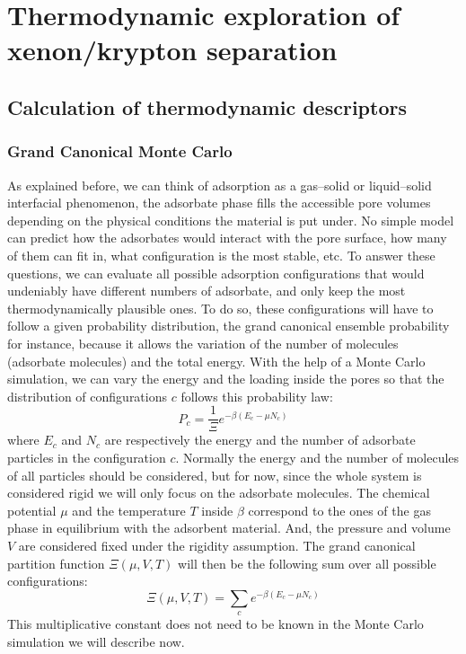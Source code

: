 \documentclass[main.tex]{subfiles}
\begin{document}
\chapter{Thermodynamic exploration of xenon/krypton separation}
\vspace*{-1\baselineskip}

\section{Calculation of thermodynamic descriptors}

\subsection{Grand Canonical Monte Carlo}

As explained before, we can think of adsorption as a gas--solid or liquid--solid interfacial phenomenon, the adsorbate phase fills the accessible pore volumes depending on the physical conditions the material is put under. No simple model can predict how the adsorbates would interact with the pore surface, how many of them can fit in, what configuration is the most stable, etc. To answer these questions, we can evaluate all possible adsorption configurations that would undeniably have different numbers of adsorbate, and only keep the most thermodynamically plausible ones. To do so, these configurations will have to follow a given probability distribution, the grand canonical ensemble probability for instance, because it allows the variation of the number of molecules (adsorbate molecules) and the total energy. With the help of a Monte Carlo simulation, we can vary the energy and the loading inside the pores so that the distribution of configurations $c$ follows this probability law: 
\begin{equation}
  P_c = \dfrac{1}{\Xi}e^{-\beta\left(E_c-\mu N_c\right)} 
  \label{eqn:gc}
\end{equation}
where $E_c$ and $N_c$ are respectively the energy and the number of adsorbate particles in the configuration $c$. Normally the energy and the number of molecules of all particles should be considered, but for now, since the whole system is considered rigid we will only focus on the adsorbate molecules. The chemical potential $\mu$ and the temperature $T$ inside $\beta$ correspond to the ones of the gas phase in equilibrium with the adsorbent material. And, the pressure and volume $V$ are considered fixed under the rigidity assumption. The grand canonical partition function $\Xi(\mu,V,T)$ will then be the following sum over all possible configurations: 
\begin{equation}
  \Xi(\mu,V,T) = \sum_c e^{-\beta\left(E_c-\mu N_c\right)} 
\end{equation}
This multiplicative constant does not need to be known in the Monte Carlo simulation we will describe now. 
\end{document}
